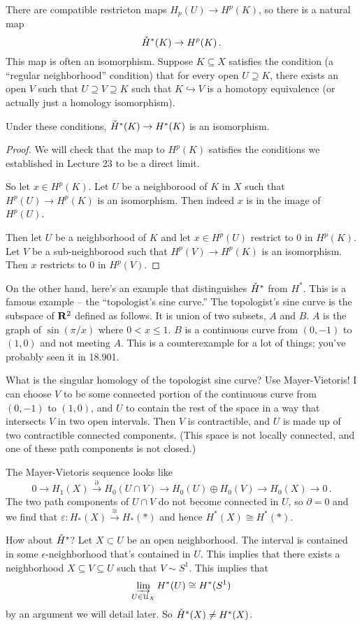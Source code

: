 There are compatible restricton maps $H_p(U)\to H^p(K)$, so there is a natural
map
\[
\check{H}^\ast(K)\to H^p(K)\,.
\]
This map is often an isomorphism. Suppose $K\subseteq X$ satisfies the condition (a ``regular neighborhood'' condition) that for every open $U\supseteq K$, there exists an open $V$ such that $U\supseteq V\supseteq K$ such that $K\hookrightarrow V$ is a homotopy equivalence (or actually just a homology isomorphism).
\begin{lemma} Under these conditions, $\check{H}^\ast(K)\to H^\ast(K)$ is an isomorphism.
\end{lemma}
\begin{proof}
We will check that the map to $H^p(K)$ satisfies the conditions we established in Lecture 23 to be a direct limit. 

So let $x\in H^p(K)$. Let $U$ be a neighborood of $K$ in $X$ such that 
$H^p(U)\to H^p(K)$ is an isomorphism. Then indeed $x$ is in the image of
$H^p(U)$. 

Then let $U$ be a neighborhood of $K$ and let $x\in H^p(U)$ restrict to
0 in $H^p(K)$. Let $V$ be a sub-neighborood such that $H^p(V)\to H^p(K)$
is an isomorphism. Then $x$ restricts to 0 in $H^p(V)$.
\end{proof}

On the other hand, here's an example that distinguishes $\check{H}^\ast$ from $H^\ast$. This is a famous example -- the ``topologist's sine curve.'' The topologist's sine curve is the subspace of $\mathbf R^2$ defined as follows. It is union of two
subsets, $A$ and $B$. $A$ is the graph of $\sin(\pi/x)$ where $0<x\leq 1$. 
$B$ is a continuous curve from $(0,-1)$ to $(1,0)$ and not meeting $A$. This is a counterexample for a lot of things; you've probably seen it in 18.901.

What is the singular homology of the topologist sine curve? Use Mayer-Vietoris! I can choose $V$ to be some connected portion of the continuous curve from $(0,-1)$ to $(1,0)$, and $U$ to contain the rest of the space in a way that intersects $V$ in two open intervals. Then $V$ is contractible, and $U$ is made up of two contractible connected components. (This space is not locally connected, and one of these path components is not closed.)

The Mayer-Vietoris sequence looks like
\[
0\to H_1(X)\xrightarrow{\partial} H_0(U\cap V)\to H_0(U)\oplus H_0(V)\to H_0(X)\to 0\,.
\]
The two path components of $U\cap V$ do not become connected in $U$, so $\partial=0$ and we find that $\varepsilon:H_*(X)\xrightarrow{\cong}H_*(\ast)$
and hence $H^*(X)\cong H^*(*)$. 

How about $\check{H}^\ast$? Let $X\subset U$ be an open neighborhood. The interval is contained in some $\epsilon$-neighborhood that's contained in $U$. This implies that there exists a neighborhood $X\subseteq V\subseteq U$ such that $V\sim S^1$. This implies that 
\[
\varinjlim_{U\in\mathcal{U}_X}H^\ast(U)\cong H^\ast(S^1)
\]
by an argument we will detail later. So $\check{H}^\ast(X)\neq H^\ast(X)$.

